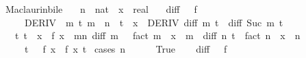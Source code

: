 \begin{isabellebody}
%
\endisadelimdocument
%
\isatagdocument
%
\isamarkuptrue%
%
\endisatagdocument
{\isafolddocument}%
%
\isadelimdocument
%
\endisadelimdocument
{}\isamarkupfalse%
\ Maclaurin{\isacharunderscore}{\kern0pt}bi{\isacharunderscore}{\kern0pt}le{\isacharcolon}{\kern0pt}\isanewline
\ \ \ n\ {\isacharcolon}{\kern0pt}{\isacharcolon}{\kern0pt}\ nat\ \ x\ {\isacharcolon}{\kern0pt}{\isacharcolon}{\kern0pt}\ real\isanewline
\ \ \ {\isachardoublequoteopen}diff\ {}\ {\isacharequal}{\kern0pt}\ f{\isachardoublequoteclose}\isanewline
\ \ \ \ \ DERIV\ {\isacharcolon}{\kern0pt}\ {\isachardoublequoteopen}{\isasymforall}m\ t{\isachardot}{\kern0pt}\ m\ {\isacharless}{\kern0pt}\ n\ {\isasymand}\ {\isasymbar}t{\isasymbar}\ {\isasymle}\ {\isasymbar}x{\isasymbar}\ {\isasymlongrightarrow}\ DERIV\ {\isacharparenleft}{\kern0pt}diff\ m{\isacharparenright}{\kern0pt}\ t\ {\isacharcolon}{\kern0pt}{\isachargreater}{\kern0pt}\ diff\ {\isacharparenleft}{\kern0pt}Suc\ m{\isacharparenright}{\kern0pt}\ t{\isachardoublequoteclose}\isanewline
\ \ \ {\isachardoublequoteopen}{\isasymexists}t{\isachardot}{\kern0pt}\ {\isasymbar}t{\isasymbar}\ {\isasymle}\ {\isasymbar}x{\isasymbar}\ {\isasymand}\ f\ x\ {\isacharequal}{\kern0pt}\ {\isacharparenleft}{\kern0pt}{\isasymSum}m{\isacharless}{\kern0pt}n{\isachardot}{\kern0pt}\ diff\ m\ {}\ {\isacharslash}{\kern0pt}\ {\isacharparenleft}{\kern0pt}fact\ m{\isacharparenright}{\kern0pt}\ {\isacharasterisk}{\kern0pt}\ x\ {\isacharcircum}{\kern0pt}\ m{\isacharparenright}{\kern0pt}\ {\isacharplus}{\kern0pt}\ diff\ n\ t\ {\isacharslash}{\kern0pt}\ {\isacharparenleft}{\kern0pt}fact\ n{\isacharparenright}{\kern0pt}\ {\isacharasterisk}{\kern0pt}\ x\ {\isacharcircum}{\kern0pt}\ n{\isachardoublequoteclose}\isanewline
\ \ \ \ {\isacharparenleft}{\kern0pt}\ {\isachardoublequoteopen}{\isasymexists}t{\isachardot}{\kern0pt}\ {\isacharunderscore}{\kern0pt}\ {\isasymand}\ f\ x\ {\isacharequal}{\kern0pt}\ {\isacharquery}{\kern0pt}f\ x\ t{\isachardoublequoteclose}{\isacharparenright}{\kern0pt}\isanewline
%
\isadelimproof
%
\endisadelimproof
%
\isatagproof
{}\isamarkupfalse%
\ {\isacharparenleft}{\kern0pt}cases\ {\isachardoublequoteopen}n\ {\isacharequal}{\kern0pt}\ {}{\isachardoublequoteclose}{\isacharparenright}{\kern0pt}\isanewline
\ \ \isamarkupfalse%
\ True\isanewline
\ \ \isamarkupfalse%
\ {\isacartoucheopen}diff\ {}\ {\isacharequal}{\kern0pt}\ f{\isacartoucheclose}\ \isamarkupfalse%

\end{isabellebody}
